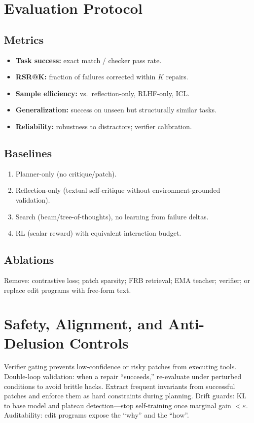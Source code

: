 \documentclass[11pt]{article}
\begin{document}
\section{Evaluation Protocol}
\subsection{Metrics}
\begin{itemize}[leftmargin=1.2em]
    \item \textbf{Task success:} exact match / checker pass rate.
    \item \textbf{RSR@K:} fraction of failures corrected within $K$ repairs.
    \item \textbf{Sample efficiency:} vs.\ reflection-only, RLHF-only, ICL.
    \item \textbf{Generalization:} success on unseen but structurally similar tasks.
    \item \textbf{Reliability:} robustness to distractors; verifier calibration.
\end{itemize}

\subsection{Baselines}
\begin{enumerate}[leftmargin=1.4em]
    \item Planner-only (no critique/patch).
    \item Reflection-only (textual self-critique without environment-grounded validation).
    \item Search (beam/tree-of-thoughts), no learning from failure deltas.
    \item RL (scalar reward) with equivalent interaction budget.
\end{enumerate}

\subsection{Ablations}
Remove: contrastive loss; patch sparsity; FRB retrieval; EMA teacher; verifier; or replace edit programs with free-form text.

\section{Safety, Alignment, and Anti-Delusion Controls}
Verifier gating prevents low-confidence or risky patches from executing tools. Double-loop validation: when a repair ``succeeds,'' re-evaluate under perturbed conditions to avoid brittle hacks. Extract frequent invariants from successful patches and enforce them as hard constraints during planning. Drift guards: KL to base model and plateau detection---stop self-training once marginal gain $<\varepsilon$. Auditability: edit programs expose the ``why'' and the ``how''.
\end{document}
